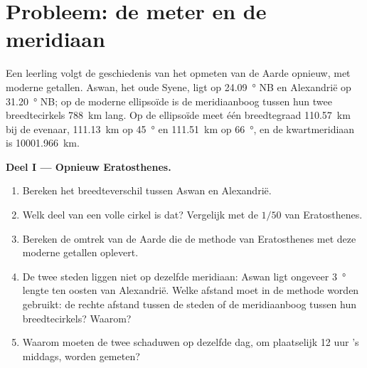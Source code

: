 \section{Probleem: de meter en de meridiaan}

\begin{problem}
\label{pb:g10:measuring-the-earth:1}
Een leerling volgt de geschiedenis van het opmeten van de Aarde opnieuw, met
moderne getallen. Aswan, het oude Syene, ligt op \qty{24.09}{\degree} NB en
Alexandrië op \qty{31.20}{\degree} NB; op de moderne ellipsoïde is de
meridiaanboog tussen hun twee breedtecirkels \qty{788}{km} lang. Op de
ellipsoïde meet één breedtegraad \qty{110.57}{km} bij de evenaar,
\qty{111.13}{km} op \qty{45}{\degree} en \qty{111.51}{km} op
\qty{66}{\degree}, en de kwartmeridiaan is
\qty{10001.966}{km}.

\medskip
\noindent\textbf{Deel I --- Opnieuw Eratosthenes.}
\begin{enumerate}
  \item Bereken het breedteverschil tussen Aswan en Alexandrië.
  \item Welk deel van een volle cirkel is dat? Vergelijk met de $1/50$ van
        Eratosthenes.
  \item Bereken de omtrek van de Aarde die de methode van Eratosthenes met
        deze moderne getallen oplevert.
  \item De twee steden liggen niet op dezelfde meridiaan: Aswan ligt ongeveer
        \qty{3}{\degree} lengte ten oosten van Alexandrië. Welke afstand moet
        in de methode worden gebruikt: de rechte afstand tussen de steden of
        de meridiaanboog tussen hun breedtecirkels? Waarom?
  \item Waarom moeten de twee schaduwen op dezelfde dag, om plaatselijk
        12 uur 's middags, worden gemeten?
\end{enumerate}


\end{problem}
